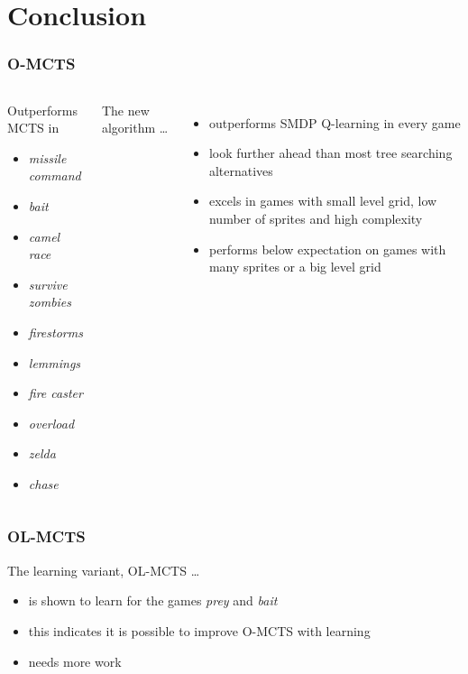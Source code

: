 \documentclass{beamer}
\begin{document}
\section{Conclusion}
\begin{frame}
	\frametitle{O-MCTS}
	\begin{columns}
		\begin{block}{Outperforms MCTS in}
			\begin{itemize}
				\item \textit{missile command}
				\item \textit{bait}
				\item \textit{camel race}
				\item \textit{survive zombies}
				\item \textit{firestorms}
				\item \textit{lemmings}
				\item \textit{fire caster}
				\item \textit{overload}
				\item \textit{zelda}
				\item \textit{chase}
			\end{itemize}
		\end{block}
		The new algorithm \ldots
			\begin{itemize}
				\item outperforms SMDP Q-learning in every game 
				\item look further ahead than most tree searching alternatives
				\item excels in games with small level grid, low number of
					sprites and high complexity
				\item performs below expectation on games with many sprites or a
					big level grid
			\end{itemize}
	\end{columns}
\end{frame}

\begin{frame}
	\frametitle{OL-MCTS}
	The learning variant, OL-MCTS \ldots
	\begin{itemize}
		\item is shown to learn for the games \textit{prey} and \textit{bait}
		\item this indicates it is possible to improve O-MCTS with learning
		\item needs more work
	\end{itemize}
\end{frame}
\end{document}
